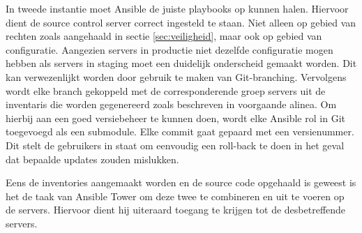 In tweede instantie moet Ansible de juiste playbooks op kunnen halen. Hiervoor dient de source control server correct ingesteld te staan. Niet alleen op gebied van rechten zoals aangehaald in sectie \ref{sec:veiligheid}, maar ook op gebied van configuratie. Aangezien servers in productie niet dezelfde configuratie mogen hebben als servers in staging moet een duidelijk onderscheid gemaakt worden. Dit kan verwezenlijkt worden door gebruik te maken van \gls{Git-branch}ing. Vervolgens wordt elke branch gekoppeld met de corresponderende groep servers uit de inventaris die worden gegenereerd zoals beschreven in voorgaande alinea. Om hierbij aan een goed versiebeheer te kunnen doen, wordt elke Ansible rol in \gls{Git} toegevoegd als een \gls{submodule}. Elke commit gaat gepaard met een versienummer. Dit stelt de gebruikers in staat om eenvoudig een roll-back te doen in het geval dat bepaalde updates zouden mislukken.

Eens de inventories aangemaakt worden en de source code opgehaald is geweest is het de taak van  Ansible Tower om deze twee te combineren en uit te voeren op de servers. Hiervoor dient hij uiteraard toegang te krijgen tot de desbetreffende servers.





